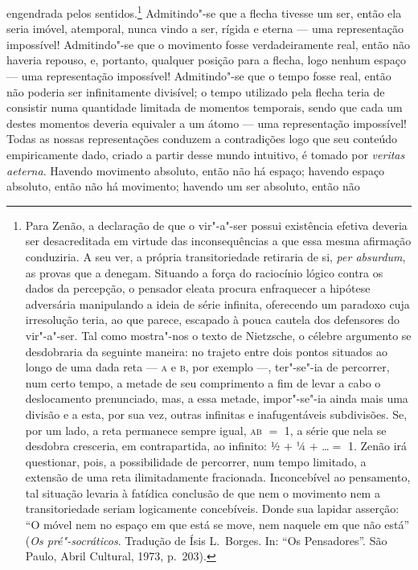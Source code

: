 engendrada pelos sentidos.\footnote{Para Zenão, a declaração de que 
o vir"-a"-ser possui existência efetiva deveria ser desacreditada em virtude 
das inconsequências a que essa mesma afirmação conduziria. A seu ver, 
a própria transitoriedade retiraria de si, \textit{per absurdum}, 
as provas que a denegam. Situando a força do raciocínio lógico contra os dados 
da percepção, o pensador eleata procura enfraquecer a
hipótese adversária manipulando a ideia de série infinita, oferecendo um
paradoxo cuja irresolução teria, ao que parece, escapado à pouca cautela dos
defensores do vir"-a"-ser. Tal como mostra"-nos o texto de Nietzsche, o
célebre argumento se desdobraria da seguinte maneira: no trajeto entre dois
pontos situados ao longo de uma dada reta --- \textsc{a} e \textsc{b}, por
exemplo ---, ter"-se"-ia de percorrer, num certo tempo, a metade de seu
comprimento a fim de levar a cabo o deslocamento prenunciado, mas, a essa
metade, impor"-se"-ia ainda mais uma divisão e a esta, por sua vez, outras
infinitas e inafugentáveis subdivisões. Se, por um lado, a reta permanece
sempre igual, \textsc{ab} $=$ 1, a série que nela se desdobra cresceria, em
contrapartida, ao infinito: ½ $+$ ¼ $+$ \ldots $=$ 1. Zenão irá questionar,
pois, a possibilidade de percorrer, num tempo limitado, a extensão de uma
reta ilimitadamente fracionada. Inconcebível ao pensamento, tal situação
levaria à fatídica conclusão de que nem o movimento nem a transitoriedade
seriam logicamente concebíveis. Donde sua lapidar asserção: ``O móvel nem no
espaço em que está se move, nem naquele em que não está'' (\textit{Os pré"-socráticos}. 
Tradução de Ísis L.~Borges. In: ``Os Pensadores''. São Paulo, Abril 
Cultural, 1973, p.~203).} Admitindo"-se que a flecha tivesse um ser, então ela 
seria imóvel, atemporal, nunca vindo a ser, rígida e eterna ---
uma representação impossível! Admitindo"-se que o movimento fosse
verdadeiramente real, então não haveria repouso, e, portanto, qualquer
posição para a flecha, logo nenhum espaço --- uma representação impossível!
Admitindo"-se que o tempo fosse real, então não poderia ser infinitamente
divisível; o tempo utilizado pela flecha teria de consistir numa quantidade
limitada de momentos temporais, sendo que cada um destes momentos deveria
equivaler a um átomo --- uma representação impossível! Todas as nossas
representações conduzem a contradições logo que seu conteúdo empiricamente
dado, criado a partir desse mundo intuitivo, é tomado por \textit{veritas aeterna}. 
Havendo movimento absoluto, então não há espaço; havendo
espaço absoluto, então não há movimento; havendo um ser absoluto, então não
